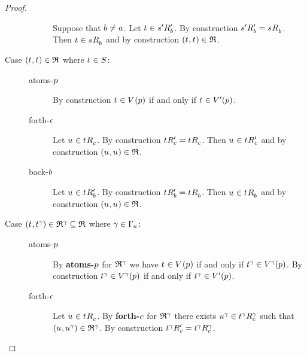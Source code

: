 \begin{proof}
\begin{description}
\begin{description}
                Suppose that $\agentB \neq \agentA$.
                Let $\kStateT \in \kSuccessorsPB{\kStateSP}$.
                By construction $\kSuccessorsPB{\kStateSP} = \kSuccessorsB{\kStateS}$.
                Then $\kStateT \in \kSuccessorsB{\kStateS}$ and by construction $(\kStateT, \kStateT) \in \refinement$.
        \end{description}
    \item[Case $(\kStateT, \kStateT) \in \refinement$ where $\kStateT \in \kStates$:]
        \hfill
        \begin{description}
            \item [atoms-$\atomP$] 
                By construction $\kStateT \in \kValuation(\atomP)$ if and only if $\kStateT \in \kValuationP(\atomP)$.
            \item [forth-$\agentC$]
                Let $\kStateU \in \kSuccessorsC{\kStateT}$.
                By construction $\kSuccessorsPC{\kStateT} = \kSuccessorsC{\kStateT}$.
                Then $\kStateU \in \kSuccessorsPC{\kStateT}$ and by construction $(\kStateU, \kStateU) \in \refinement$.
            \item [back-$\agentB$]
                Let $\kStateU \in \kSuccessorsPB{\kStateT}$.
                By construction $\kSuccessorsPB{\kStateT} = \kSuccessorsB{\kStateT}$.
                Then $\kStateU \in \kSuccessorsB{\kStateT}$ and by construction $(\kStateU, \kStateU) \in \refinement$.
        \end{description}
    \item[{Case $(\kStateT, \kStateT[\gamma]) \in \refinement^\gamma \subseteq \refinement$ where $\gamma \in \Gamma_\agentA$:}]
        \hfill
        \begin{description}
            \item [atoms-$\atomP$]
                By {\bf atoms-$\atomP$} for $\refinement^\gamma$ we have $\kStateT \in \kValuation(\atomP)$ if and only if $\kStateT[\gamma] \in \kValuation[\gamma](\atomP)$.
                By construction $\kStateT[\gamma] \in \kValuation[\gamma](\atomP)$ if and only if $\kStateT[\gamma] \in \kValuationP(\atomP)$.
            \item [forth-$\agentC$]
                Let $\kStateU \in \kSuccessorsC{\kStateT}$.
                By {\bf forth-$\agentC$} for $\refinement^\gamma$ there exists $\kStateU[\gamma] \in \kSuccessorsC[\gamma]{\kStateT[\gamma]}$ such that $(\kStateU, \kStateU[\gamma]) \in \refinement^\gamma$.
                By construction $\kSuccessorsPC{\kStateT[\gamma]} = \kSuccessorsC[\gamma]{\kStateT[\gamma]}$.

\end{description}
\end{description}
\end{proof}
